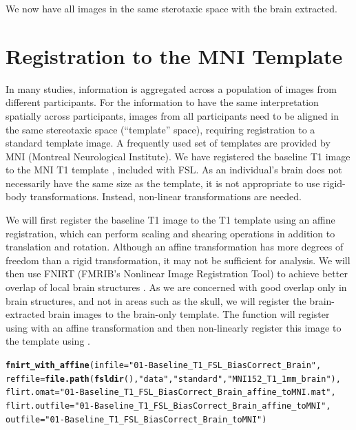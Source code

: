 \documentclass[a4paper]{report}\usepackage[]{graphicx}\usepackage[]{color}
\makeatletter
\newcommand{\hlstr}[1]{\textcolor[rgb]{0.192,0.494,0.8}{#1}}%
\newcommand{\hlstd}[1]{\textcolor[rgb]{0.345,0.345,0.345}{#1}}%
\newcommand{\hlkwc}[1]{\textcolor[rgb]{0.333,0.667,0.333}{#1}}%
\newcommand{\hlkwd}[1]{\textcolor[rgb]{0.737,0.353,0.396}{\textbf{#1}}}%
\newenvironment{kframe}{%
 \def\at@end@of@kframe{}%
 \ifinner\ifhmode%
  \def\at@end@of@kframe{\end{minipage}}%
  \begin{minipage}{\columnwidth}%
 \fi\fi%
 \def\FrameCommand##1{\hskip\@totalleftmargin \hskip-\fboxsep
 \colorbox{shadecolor}{##1}\hskip-\fboxsep
     \hskip-\linewidth \hskip-\@totalleftmargin \hskip\columnwidth}%
 \MakeFramed {\advance\hsize-\width
   \@totalleftmargin\z@ \linewidth\hsize
   \@setminipage}}%
 {\par\unskip\endMakeFramed%
 \at@end@of@kframe}
\newenvironment{knitrout}{}{} %
\newcommand\gobblepars{%
    \@ifnextchar\par%
        {\expandafter\gobblepars\@gobble}%
        {}}
\let\pkg=\strong
\DeclareRobustCommand\code{\bgroup\@noligs\@codex}
\makeatother
\begin{document}
\begin{article}
We now have all images in the same sterotaxic space with the brain extracted.  

\section{Registration to the MNI Template}
In many studies, information is aggregated across a population of images from different participants.  For the information to have the same interpretation spatially across participants, images from all participants need to be aligned in the same stereotaxic space (``template'' space), requiring registration to a standard template image.  A frequently used set of templates are provided by MNI (Montreal Neurological Institute). We have registered the baseline T1 image to the MNI T1 template \citep{hutchison_symmetric_2006}, included with FSL.  As an individual's brain does not necessarily have the same size as the template, it is not appropriate to use rigid-body transformations.  Instead, non-linear transformations are needed.


We will first register the baseline T1 image to the T1 template using an affine registration, which can perform scaling and shearing operations in addition to translation and rotation.  Although an affine transformation has more degrees of freedom than a rigid transformation, it may not be sufficient for analysis.  We will then use FNIRT (FMRIB's Nonlinear Image Registration Tool) to achieve better overlap of local brain structures \citep{jenkinson_fsl_2012, andersson_non-linear_2007}.  As we are concerned with good overlap only in brain structures, and not in areas such as the skull, we will register the brain-extracted brain images to the brain-only template.  The \pkg{fslr} function \code{fnirt\_with\_affine} will register using \code{flirt} with an affine transformation and then non-linearly register this image to the template using \code{fnirt}.


\gobblepars
\begin{knitrout}
\color{fgcolor}\begin{kframe}
\begin{alltt}
\hlkwd{fnirt_with_affine}\hlstd{(}\hlkwc{infile} \hlstd{=} \hlstr{"01-Baseline_T1_FSL_BiasCorrect_Brain"}\hlstd{,}
                  \hlkwc{reffile} \hlstd{=} \hlkwd{file.path}\hlstd{(}\hlkwd{fsldir}\hlstd{(),} \hlstr{"data"}\hlstd{,} \hlstr{"standard"}\hlstd{,} \hlstr{"MNI152_T1_1mm_brain"}\hlstd{),}
                  \hlkwc{flirt.omat} \hlstd{=} \hlstr{"01-Baseline_T1_FSL_BiasCorrect_Brain_affine_toMNI.mat"}\hlstd{,}
                  \hlkwc{flirt.outfile} \hlstd{=} \hlstr{"01-Baseline_T1_FSL_BiasCorrect_Brain_affine_toMNI"}\hlstd{,}
                  \hlkwc{outfile} \hlstd{=} \hlstr{"01-Baseline_T1_FSL_BiasCorrect_Brain_toMNI"}\hlstd{)}
\end{alltt}
\end{kframe}
\end{knitrout}
\gobblepars


\end{article}
\end{document}
